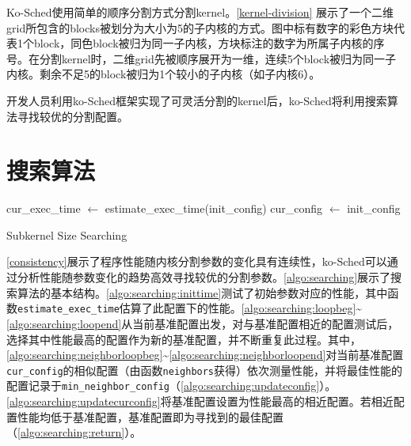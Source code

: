 Ko-Sched使用简单的顺序分割方式分割kernel。\autoref{kernel-division} 展示了一个二维grid所包含的blocks被划分为大小为5的子内核的方式。图中标有数字的彩色方块代表1个block，同色block被归为同一子内核，方块标注的数字为所属子内核的序号。在分割kernel时，二维grid先被顺序展开为一维，连续5个block被归为同一子内核。剩余不足5的block被归为1个较小的子内核（如子内核6）。

开发人员利用ko-Sched框架实现了可灵活分割的kernel后，ko-Sched将利用搜索算法寻找较优的分割配置。

\section{搜索算法}

\begin{algorithm}[htbp]
    \SetAlgoLined
    cur\_exec\_time $\gets$ estimate\_exec\_time(init\_config)\; \label{algo:searching:inittime}
    cur\_config $\gets$ init\_config\; \label{algo:searching:initconfig}
    \label{algo:searching:loopend}
    \caption{Subkernel Size Searching}
    \label{algo:searching}
\end{algorithm}

\autoref{consistency}展示了程序性能随内核分割参数的变化具有连续性，ko-Sched可以通过分析性能随参数变化的趋势高效寻找较优的分割参数。\autoref{algo:searching}展示了搜索算法的基本结构。\autoref{algo:searching:inittime}测试了初始参数对应的性能，其中函数\texttt{estimate\_exec\_time}估算了此配置下的性能。\autoref{algo:searching:loopbeg}\textasciitilde\autoref{algo:searching:loopend}从当前基准配置出发，对与基准配置相近的配置测试后，选择其中性能最高的配置作为新的基准配置，并不断重复此过程。其中，\autoref{algo:searching:neighborloopbeg}\textasciitilde\autoref{algo:searching:neighborloopend}对当前基准配置\texttt{cur\_config}的相似配置（由函数\texttt{neighbors}获得）依次测量性能，并将最佳性能的配置记录于\texttt{min\_neighbor\_config}（\autoref{algo:searching:updateconfig}）。\autoref{algo:searching:updatecurconfig}将基准配置设置为性能最高的相近配置。若相近配置性能均低于基准配置，基准配置即为寻找到的最佳配置（\autoref{algo:searching:return}）。


